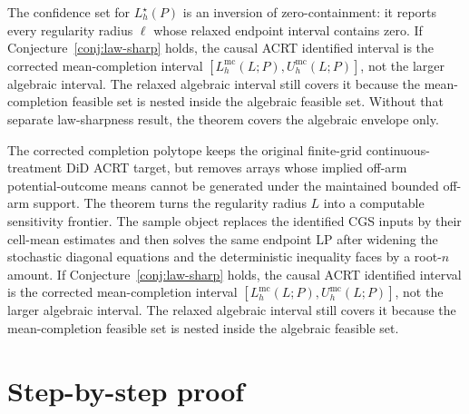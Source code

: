 \documentclass[11pt]{article}
\theoremstyle{definition}
\theoremstyle{plain}
\theoremstyle{remark}
\begin{document}
The confidence set for \(L_h^\star(P)\) is an inversion of zero-containment:
it reports every regularity radius \(\ell\) whose relaxed endpoint interval
contains zero.  If Conjecture~\ref{conj:law-sharp} holds, the causal ACRT
identified interval is the corrected mean-completion interval
\([L_h^{\mathrm{mc}}(L;P),U_h^{\mathrm{mc}}(L;P)]\), not the larger algebraic
interval.  The relaxed algebraic interval still covers it because the
mean-completion feasible set is nested inside the algebraic feasible set.
Without that separate law-sharpness result, the theorem covers the algebraic
envelope only.

The corrected completion polytope keeps the original finite-grid
continuous-treatment DiD ACRT target, but removes arrays whose implied off-arm
potential-outcome means cannot be generated under the maintained bounded off-arm
support.  The theorem turns the regularity radius \(L\) into a computable
sensitivity frontier.  The sample object replaces the identified CGS inputs by
their cell-mean estimates and then solves the same endpoint LP after widening
the stochastic diagonal equations and the deterministic inequality faces by a
root-\(n\) amount.  If Conjecture~\ref{conj:law-sharp} holds, the causal ACRT
identified interval is the corrected mean-completion interval
\([L_h^{\mathrm{mc}}(L;P),U_h^{\mathrm{mc}}(L;P)]\), not the larger algebraic
interval.  The relaxed algebraic interval still covers it because the
mean-completion feasible set is nested inside the algebraic feasible set.

\section{Step-by-step proof}
\end{document}
